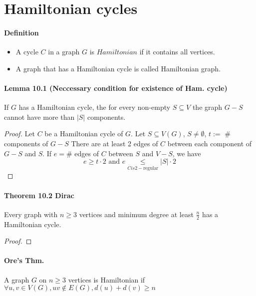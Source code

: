 \section{Hamiltonian cycles}
\paragraph{Definition}
\begin{itemize}
    \item A cycle $ C $ in a graph $ G $ is $Hamiltonian$ 
    if it contains all vertices.

    \item  A graph that has a Hamiltonian cycle is called Hamiltonian graph.
\end{itemize}


\paragraph{Lemma 10.1 (Neccessary condition for existence of Ham. cycle)} $ $\\
If $G$ has a Hamiltonian cycle, the for every non-empty $S \subseteq V$ the 
graph $G - S$ cannot have more than $|S|$ components.
\begin{proof}
    Let $ C $ be a Hamiltonian cycle of $ G$.
    Let $ S \subseteq V(G) $, $ S \neq \emptyset $, $ t := $ \# components of $ G - S $
    There are at least 2 edges of $ C $ between each component of $ G - S $
    and $ S$. If $ e = \#$ edges of $ C $ between $ S $ and $ V - S$, 
    we have 
    $$ e \geq t \cdot 2 \text{ and } e \underset{C is 2-\text{regular}}{\leq}
    |S| \cdot 2 $$ 
\end{proof}

\paragraph{Theorem 10.2 Dirac} Every graph with $n \geq 3$ vertices and 
minimum degree at least $\frac{n}{2}$ has a Hamiltonian cycle.
\begin{proof}
    {\color{red}{TODO}}
\end{proof}

\paragraph{Ore's Thm.}
A graph $ G $ on $ n \geq 3 $ vertices is Hamiltonian if  
$ \forall u,v \in V(G), uv \notin E(G), d(u)+d(v) \geq n $